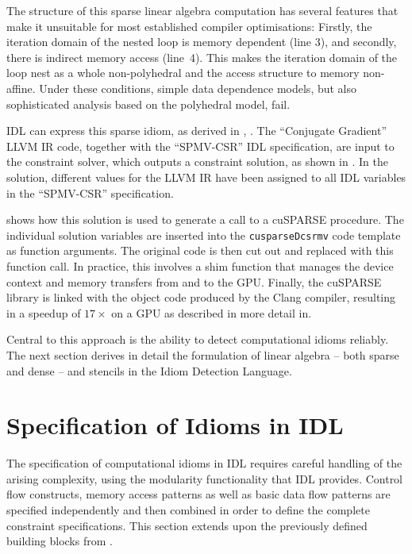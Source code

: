     The structure of this sparse linear algebra computation has several features
    that make it unsuitable for most established compiler optimisations:
    Firstly, the iteration domain of the nested loop is memory dependent
    (line 3), and secondly, there is indirect memory access (line~4).
    This makes the iteration domain of the loop nest as a whole non-polyhedral
    and the access structure to memory non-affine.
    Under these conditions, simple data dependence models, but also
    sophisticated analysis based on the polyhedral model, fail.

    IDL can express this sparse idiom, as derived in ,
    .
    The ``Conjugate Gradient'' LLVM IR code, together with the ``SPMV-CSR''
    IDL specification, are input to the constraint solver, which outputs a
    constraint solution, as shown in .
    In the solution, different values for the LLVM IR have been assigned to all
    IDL variables in the ``SPMV-CSR'' specification.

     shows how this solution is used to generate a
    call to a cuSPARSE procedure.
    The individual solution variables are inserted into the {\tt cusparseDcsrmv}
    code template as function arguments. 
    The original code is then cut out and replaced with this function call.
    In practice, this involves a shim function that manages the device context
    and memory transfers from and to the GPU.
    Finally, the cuSPARSE library is linked with the object code produced by the
    Clang compiler, resulting in a speedup of $17\times$ on a GPU as described
    in more detail in.

    Central to this approach is the ability to detect computational idioms
    reliably.
    The next section derives in detail the formulation of linear algebra -- both
    sparse and dense -- and stencils in the Idiom Detection Language.

\begin{figure}[p]
    
\end{figure}

\section{Specification of Idioms in IDL}
\label{sec:idioms}

    The specification of computational idioms in IDL requires careful
    handling of the arising complexity, using the modularity functionality that
    IDL provides.
    Control flow constructs, memory access patterns as well as basic data flow
    patterns are specified independently and then combined in order to define
    the complete constraint specifications.
    This section extends upon the previously defined building blocks from
    .

